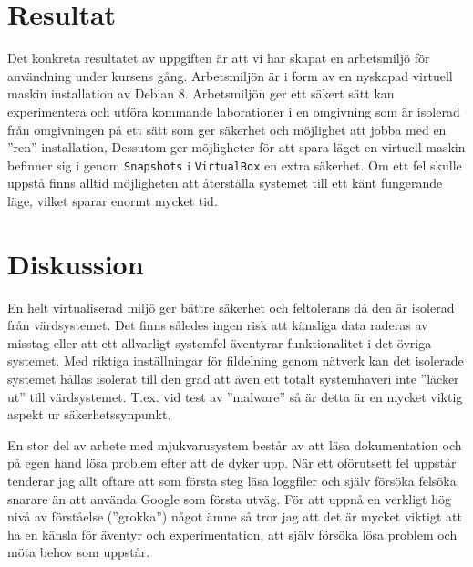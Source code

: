 %


\section{Resultat}
Det konkreta resultatet av uppgiften är att vi har skapat en arbetsmiljö för
användning under kursens gång. Arbetsmiljön är i form av en nyskapad virtuell
maskin installation av Debian 8.  Arbetsmiljön ger ett säkert sätt kan
experimentera och utföra kommande laborationer i en omgivning som är isolerad
från omgivningen på ett sätt som ger säkerhet och möjlighet att jobba med en
''ren'' installation, Dessutom ger möjligheter för att spara läget en virtuell
maskin befinner sig i genom \texttt{Snapshots} i \texttt{VirtualBox} en extra
säkerhet. Om ett fel skulle uppstå finns alltid möjligheten att återställa
systemet till ett känt fungerande läge, vilket sparar enormt mycket tid.


\section{Diskussion}
En helt virtualiserad miljö ger bättre säkerhet och feltolerans då den är
isolerad från värdsystemet. Det finns således ingen risk att känsliga data
raderas av misstag eller att ett allvarligt systemfel äventyrar funktionalitet
i det övriga systemet. Med riktiga inställningar för fildelning genom nätverk
kan det isolerade systemet hållas isolerat till den grad att även ett totalt
systemhaveri inte ''läcker ut'' till värdsystemet. T.ex. vid test av
''malware'' så är detta är en mycket viktig aspekt ur säkerhetssynpunkt.
\par En stor del av arbete med mjukvarusystem består av att läsa dokumentation
och på egen hand lösa problem efter att de dyker upp. När ett oförutsett fel
uppstår tenderar jag allt oftare att som första steg läsa loggfiler och själv
försöka felsöka snarare än att använda Google som första utväg. För att uppnå
en verkligt hög nivå av förståelse (''grokka'') något ämne så tror jag att
det är mycket viktigt att ha en känsla för äventyr och experimentation, att
själv försöka lösa problem och möta behov som uppstår.


